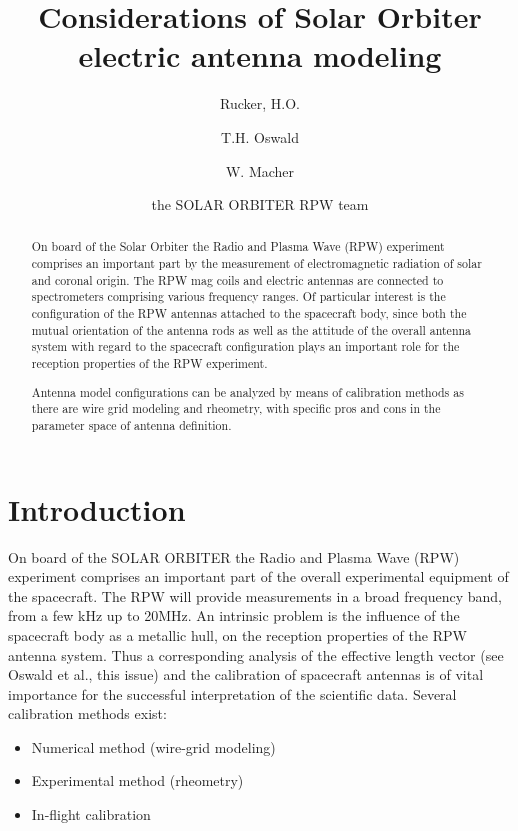 \documentclass[a4paper,twocolumn]{esapub2005} %
\title{Considerations of Solar Orbiter electric antenna modeling}
\author[*]{Rucker, H.O.}
\author[*]{T.H. Oswald}
\author[*]{W. Macher}
\affil[*]{Space Research Institute, Austrian Academy of Sciences, A-8042 Graz, Austria, rucker@oeaw.ac.at}
\author[ ]{the SOLAR ORBITER RPW team}
\begin{document}

\maketitle

\begin{abstract}
On board of the Solar Orbiter the Radio and Plasma Wave (RPW) experiment comprises an important part by the measurement of electromagnetic radiation of solar and coronal origin. The RPW mag coils and electric antennas are connected to spectrometers comprising various frequency ranges. Of particular interest is the configuration of the RPW antennas attached to the spacecraft body, since both the mutual orientation of the antenna rods as well as the attitude of the overall antenna system with regard to the spacecraft configuration plays an important role for the reception properties of the RPW experiment.

Antenna model configurations can be analyzed by means of calibration methods as there are wire grid modeling and rheometry, with specific pros and cons in the  parameter space of antenna definition.
\end{abstract}

\section{Introduction}
On board of the SOLAR ORBITER the Radio and Plasma Wave (RPW) experiment comprises an important part of the overall experimental equipment of the spacecraft. The RPW will provide measurements in a broad frequency band, from a few kHz up to 20MHz. An intrinsic problem is the influence of the spacecraft body as a metallic hull, on the reception properties of the RPW antenna system. Thus a corresponding analysis of the effective length vector (see Oswald et al., this issue) and the calibration of spacecraft antennas is of vital importance for the successful interpretation of the scientific data. Several calibration methods exist:

\begin{itemize}
    \item Numerical method (wire-grid modeling)\\ \cite{cassini,pre6,my_masterthesis,cassini3,ruckerundi05}
\item Experimental method (rheometry)\\ \cite{cassini3,rheometry}
\item In-flight calibration\\ \cite{vogl_04}
\end{itemize}
\end{document}
